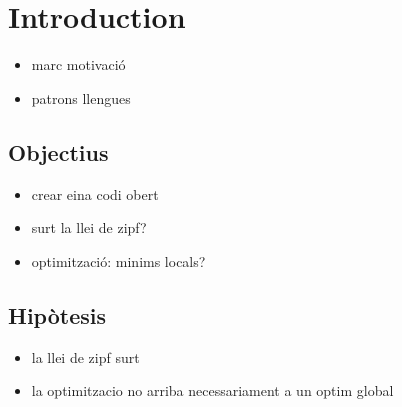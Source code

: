 \chapter{Introduction}
\begin{itemize}
\item marc motivació
\item patrons llengues
\end{itemize}
\section{Objectius}
\begin{itemize}
\item crear eina codi obert
\item surt la llei de zipf?
\item optimització: minims locals?
\end{itemize}
\section{Hipòtesis}
\begin{itemize}
\item la llei de zipf surt
\item la optimitzacio no arriba necessariament a un optim global
\end{itemize}
